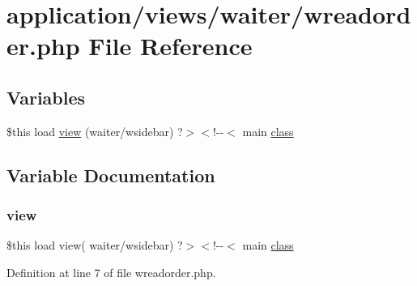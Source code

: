 \hypertarget{wreadorder_8php}{}\section{application/views/waiter/wreadorder.php File Reference}
\label{wreadorder_8php}
\subsection*{Variables}
\begin{DoxyCompactItemize}
\item 
\$this load \mbox{\hyperlink{wreadorder_8php_a3f75645b356759573f9a6e113f619a48}{view}} (\textquotesingle{}waiter/wsidebar\textquotesingle{}) ?$>$$<$!-\/-\/$<$ main \mbox{\hyperlink{waiter_2olaporan_8php_a185c73c6507391d1eb38c776b68ce96d}{class}}
\end{DoxyCompactItemize}


\subsection{Variable Documentation}
\mbox{\label{wreadorder_8php_a3f75645b356759573f9a6e113f619a48}} 
\subsubsection{\texorpdfstring{view}{view}}
{\footnotesize\ttfamily \$this load view( \textquotesingle{}waiter/wsidebar\textquotesingle{}) ?$>$$<$!-\/-\/$<$ main \mbox{\hyperlink{waiter_2olaporan_8php_a185c73c6507391d1eb38c776b68ce96d}{class}}}



Definition at line 7 of file wreadorder.\+php.

